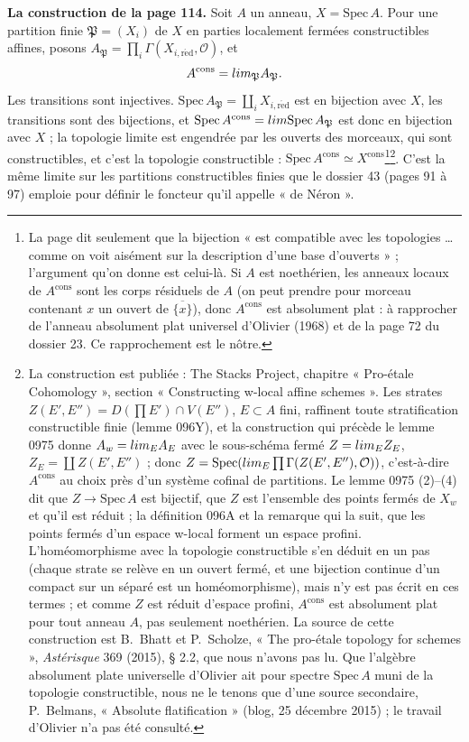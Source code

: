 \documentclass[11pt,a4paper]{article}
\begin{document}
\textbf{La construction de la page 114.} Soit $A$ un anneau, $X =
\mathrm{Spec}\,A$. Pour une partition finie $\mathfrak{P} = (X_i)$ de $X$ en parties
localement fermées constructibles affines, posons $A_{\mathfrak{P}} = \prod_i
\Gamma(X_{i,\mathrm{r\acute ed}}, \mathcal{O})$, et
\[
  A^{\mathrm{cons}} = \varinjlim_{\mathfrak{P}} A_{\mathfrak{P}} .
\]
Les transitions sont injectives. $\mathrm{Spec}\,A_{\mathfrak{P}} = \coprod_i
X_{i,\mathrm{r\acute ed}}$ est en bijection avec $X$, les transitions sont des
bijections, et $\mathrm{Spec}\,A^{\mathrm{cons}} = \varprojlim
\mathrm{Spec}\,A_{\mathfrak{P}}$ est donc en bijection avec $X$ ; la topologie
limite est engendrée par les ouverts des morceaux, qui sont constructibles, et
c'est la topologie constructible : $\mathrm{Spec}\,A^{\mathrm{cons}} \simeq
X^{\mathrm{cons}}$\footnote{La page dit seulement que la bijection « est
compatible avec les topologies \ldots{} comme on voit aisément sur la
description d'une base d'ouverts » ; l'argument qu'on donne est celui-là. Si
$A$ est noethérien, les anneaux locaux de $A^{\mathrm{cons}}$ sont les corps
résiduels de $A$ (on peut prendre pour morceau contenant $x$ un ouvert de
$\overline{\{x\}}$), donc $A^{\mathrm{cons}}$ est absolument plat : à
rapprocher de l'anneau absolument plat universel d'Olivier (1968) et de la
page 72 du dossier 23. Ce rapprochement est le nôtre.}\footnote{La
construction est publiée : The Stacks Project, chapitre « Pro-étale
Cohomology », section « Constructing w-local affine schemes ». Les strates
$Z(E', E'') = D(\prod E') \cap V(E'')$, $E \subset A$ fini, raffinent toute
stratification constructible finie (lemme 096Y), et la construction qui
précède le lemme 0975 donne $A_w = \varinjlim_E A_E$ avec le sous-schéma fermé
$Z = \varprojlim_E Z_E$, $Z_E = \coprod Z(E', E'')$ ; donc $Z =
\mathrm{Spec}(\varinjlim_E \prod \Gamma(Z(E', E''), \mathcal{O}))$, c'est-à-dire
$A^{\mathrm{cons}}$ au choix près d'un système cofinal de partitions. Le lemme
0975 (2)--(4) dit que $Z \to \mathrm{Spec}\,A$ est bijectif, que $Z$ est
l'ensemble des points fermés de $X_w$ et qu'il est réduit ; la définition 096A
et la remarque qui la suit, que les points fermés d'un espace w-local forment
un espace profini. L'homéomorphisme avec la topologie constructible s'en
déduit en un pas (chaque strate se relève en un ouvert fermé, et une
bijection continue d'un compact sur un séparé est un homéomorphisme), mais
n'y est pas écrit en ces termes ; et comme $Z$ est réduit d'espace profini,
$A^{\mathrm{cons}}$ est absolument plat pour tout anneau $A$, pas seulement
noethérien. La source de cette construction est B.~Bhatt et P.~Scholze,
« The pro-étale topology for schemes », \emph{Astérisque} 369 (2015), § 2.2,
que nous n'avons pas lu. Que l'algèbre absolument plate universelle d'Olivier
ait pour spectre $\mathrm{Spec}\,A$ muni de la topologie constructible, nous ne
le tenons que d'une source secondaire, P.~Belmans, « Absolute
flatification » (blog, 25 décembre 2015) ; le travail d'Olivier n'a pas été
consulté.}. C'est la même limite
sur les partitions constructibles finies que le dossier 43 (pages 91 à 97)
emploie pour définir le foncteur qu'il appelle « de Néron ».
\end{document}
